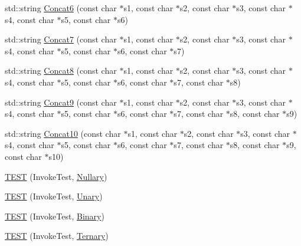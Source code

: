 \begin{DoxyCompactItemize}
\item 
std\+::string \mbox{\hyperlink{namespacetesting_1_1gmock__more__actions__test_a4ddf77266c433ef69d302bfc68153544}{Concat6}} (const char $\ast$s1, const char $\ast$s2, const char $\ast$s3, const char $\ast$s4, const char $\ast$s5, const char $\ast$s6)
\item 
std\+::string \mbox{\hyperlink{namespacetesting_1_1gmock__more__actions__test_a2ed0b2da1e123d5aaef59b0ea37e3844}{Concat7}} (const char $\ast$s1, const char $\ast$s2, const char $\ast$s3, const char $\ast$s4, const char $\ast$s5, const char $\ast$s6, const char $\ast$s7)
\item 
std\+::string \mbox{\hyperlink{namespacetesting_1_1gmock__more__actions__test_aa4419cf22a6e6760b8d38828f088cae1}{Concat8}} (const char $\ast$s1, const char $\ast$s2, const char $\ast$s3, const char $\ast$s4, const char $\ast$s5, const char $\ast$s6, const char $\ast$s7, const char $\ast$s8)
\item 
std\+::string \mbox{\hyperlink{namespacetesting_1_1gmock__more__actions__test_a302f1938b41c2ce503a7628aa45cd017}{Concat9}} (const char $\ast$s1, const char $\ast$s2, const char $\ast$s3, const char $\ast$s4, const char $\ast$s5, const char $\ast$s6, const char $\ast$s7, const char $\ast$s8, const char $\ast$s9)
\item 
std\+::string \mbox{\hyperlink{namespacetesting_1_1gmock__more__actions__test_a4a2fcb45125cd238e4146a4b0c568414}{Concat10}} (const char $\ast$s1, const char $\ast$s2, const char $\ast$s3, const char $\ast$s4, const char $\ast$s5, const char $\ast$s6, const char $\ast$s7, const char $\ast$s8, const char $\ast$s9, const char $\ast$s10)
\item 
\mbox{\hyperlink{namespacetesting_1_1gmock__more__actions__test_a9c5fbd26c6cc6ed31aed5bafb2fa8e5c}{T\+E\+ST}} (Invoke\+Test, \mbox{\hyperlink{namespacetesting_1_1gmock__more__actions__test_acdd2dd80f777fdb770b513b63064ac19}{Nullary}})
\item 
\mbox{\hyperlink{namespacetesting_1_1gmock__more__actions__test_a28b57a9f9d38574b7c033988ad528ddd}{T\+E\+ST}} (Invoke\+Test, \mbox{\hyperlink{namespacetesting_1_1gmock__more__actions__test_aad456ea2ee1b0cb2741b676a34f540a3}{Unary}})
\item 
\mbox{\hyperlink{namespacetesting_1_1gmock__more__actions__test_a906bd5cc7aa38e2cc861a9732481fce7}{T\+E\+ST}} (Invoke\+Test, \mbox{\hyperlink{namespacetesting_1_1gmock__more__actions__test_ad772cefe4443030c4b50e0d497d0edbb}{Binary}})
\item 
\mbox{\hyperlink{namespacetesting_1_1gmock__more__actions__test_a424fb6113c6c1ab2157edf854a4ae9fe}{T\+E\+ST}} (Invoke\+Test, \mbox{\hyperlink{namespacetesting_1_1gmock__more__actions__test_ab98b352528a0b72625b4710a6fc648a1}{Ternary}})

\end{DoxyCompactItemize}
